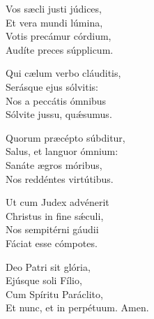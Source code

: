 Vos sæcli justi júdices,\\
Et vera mundi lúmina,\\
Votis precámur córdium,\\
Audíte preces súpplicum.

Qui cælum verbo cláuditis,\\
Serásque ejus sólvitis:\\
Nos a peccátis ó\-mnibus\\
Sólvite jussu, quǽsumus.

Quorum præcépto súbditur,\\
Salus, et languor ó\-mnium:\\
Sanáte ægros móribus,\\
Nos reddéntes virtútibus.

Ut cum Judex advénerit\\
Christus in fine sǽculi,\\
Nos sempitérni gáudii\\
Fáciat esse cómpotes.

Deo Patri sit glória,\\
Ejúsque soli Fílio,\\
Cum Spíritu Paráclito,\\
Et nunc, et in perpétuum.
Amen.